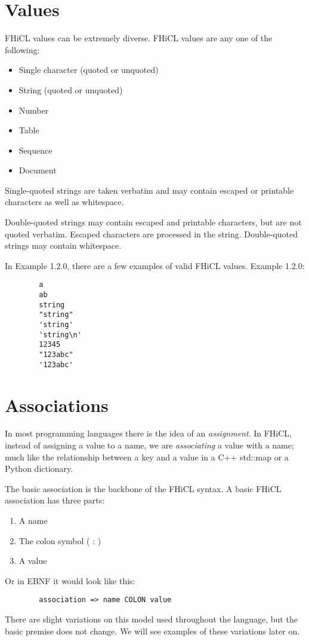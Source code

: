 \documentclass{memarticle}
\begin{document}
\chapter{Values}
	FHiCL values can be extremely diverse.
	FHiCL values are any one of the following:
	\begin{itemize}
		\item Single character (quoted or unquoted)
		\item String (quoted or unquoted)
		\item Number
		\item Table
		\item Sequence
		\item Document
	\end{itemize}
	\par
	Single-quoted strings are taken verbatim
	and may contain escaped or printable characters as well as whitespace.
	\par
	Double-quoted strings may contain escaped and printable characters,
	but are not quoted verbatim. 
	Escaped characters are processed in the string. 
	Double-quoted strings may contain whitespace.
	\par
	In Example 1.2.0, there are a few examples of valid FHiCL values.
	Example 1.2.0:
	\begin{verbatim}
		a
		ab
		string
		"string"
		'string'
		'string\n'
		12345
		"123abc"
		'123abc'
	\end{verbatim}
\chapter{Associations}
	In most programming languages there is the idea of an \emph{assignment}. 
	In FHiCL,  instead of assigning a value to a name, 
	we are \emph{associating} a value with a name; 
	much like the relationship between a key and a value in a C++ std::map or a Python dictionary.
	\par
	The basic association is the backbone of the FHiCL syntax.
	A basic FHiCL association has three parts:
	\begin{enumerate}
		\item A name
		\item The colon symbol ( : )
		\item A value
	\end{enumerate}
	\par
	Or in EBNF it would look like this:
	\begin{verbatim}
		association => name COLON value
	\end{verbatim}
	\par
	There are slight variations on this model used throughout the language,
	but the basic premise does not change. 
	We will see examples of these variations later on.
\end{document}

